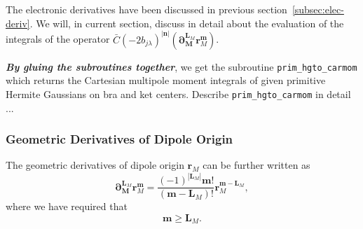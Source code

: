 \documentclass[a4paper,11pt,twoside,openright]{book}
\newcommand{\fixme}[1]{\textbf{\textit{\color{red} #1}}}
\begin{document}
The electronic derivatives have been discussed in previous section~\ref{subsec:elec-deriv}.
We will, in current section, discuss in detail about the evaluation of the integrals of the operator
$\bar{C}(-2b_{j\lambda})^{|\boldsymbol{n}|}%
\left(\boldsymbol{\partial}_{\boldsymbol{M}}^{\boldsymbol{L}_{M}}\boldsymbol{r}_{M}^{\boldsymbol{m}}\right)$.

\fixme{By gluing the subroutines together}, we get the subroutine \verb|prim_hgto_carmom|
which returns the Cartesian multipole moment integrals of given primitive Hermite Gaussians on bra
and ket centers. Describe \verb|prim_hgto_carmom| in detail ...

\subsubsection{Geometric Derivatives of Dipole Origin}

The geometric derivatives of dipole origin $\boldsymbol{r}_{M}$ can be further written as
\begin{equation}
  \boldsymbol{\partial}_{\boldsymbol{M}}^{\boldsymbol{L}_{M}}\boldsymbol{r}_{M}^{\boldsymbol{m}} %
    =\frac{(-1)^{|\boldsymbol{L}_{M}|}\boldsymbol{m}!}{(\boldsymbol{m}-\boldsymbol{L}_{M})!} %
      \boldsymbol{r}_{M}^{\boldsymbol{m}-\boldsymbol{L}_{M}},
\end{equation}
where we have required that
\begin{equation}
  \boldsymbol{m}\ge\boldsymbol{L}_{M}.
\end{equation}
\end{document}
